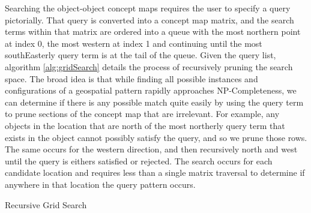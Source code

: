 Searching the object-object concept maps requires the user to specify a query pictorially. 
That query is converted into a concept map matrix, and the search terms within that matrix are ordered into a queue with the most northern point at index 0, the most western at index 1 and continuing until the most southEasterly query term is at the tail of the queue. 
Given the query list, algorithm \ref{alg:gridSearch} details the process of recursively pruning the search space. 
The broad idea is that while finding all possible instances and configurations of a geospatial pattern rapidly approaches NP-Completeness, we can determine if there is any possible match quite easily by using the query term to prune sections of the concept map that are irrelevant. 
For example, any objects in the location that are north of the most northerly query term that exists in the object cannot possibly satisfy the query, and so we prune those rows. 
The same occurs for the western direction, and then recursively north and west until the query is eithers satisfied or rejected. The search occurs for each candidate location and requires less than a single matrix traversal to determine if anywhere in that location the query pattern occurs. 

\begin{algorithm}
    \caption{Recursive Grid Search}\label{alg:gridSearch}
    \begin{algorithmic}
        \State{- - - - -}
                \Else
                \EndIf            
            \EndIf
                \EndIf
            \EndIf
                \EndIf
            \EndIf
        \EndProcedure
    \end{algorithmic}
\end{algorithm}


